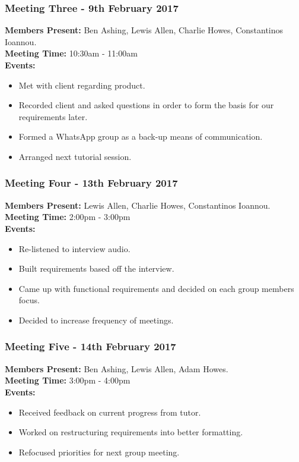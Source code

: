 \documentclass[a4paper]{article}
\begin{document}
\subsubsection*{Meeting Three - 9th February 2017}
\textbf{Members Present:} Ben Ashing, Lewis Allen, Charlie Howes, Constantinos Ioannou. \\
\textbf{Meeting Time:} 10:30am - 11:00am \\
\textbf{Events:} 
\begin{itemize}
    \item Met with client regarding product.
    \item Recorded client and asked questions in order to form the basis for our requirements later.
    \item Formed a WhatsApp group as a back-up means of communication.
    \item Arranged next tutorial session.
\end{itemize}

\subsubsection*{Meeting Four - 13th February 2017}
\textbf{Members Present:} Lewis Allen, Charlie Howes, Constantinos Ioannou. \\
\textbf{Meeting Time:} 2:00pm - 3:00pm \\
\textbf{Events:} 
\begin{itemize}
    \item Re-listened to interview audio.
    \item Built requirements based off the interview.
    \item Came up with functional requirements and decided on each group members focus.
    \item Decided to increase frequency of meetings.
\end{itemize}

\subsubsection*{Meeting Five - 14th February 2017}
\textbf{Members Present:} Ben Ashing, Lewis Allen, Adam Howes. \\
\textbf{Meeting Time:} 3:00pm - 4:00pm \\
\textbf{Events:} 
\begin{itemize}
    \item Received feedback on current progress from tutor.
    \item Worked on restructuring requirements into better formatting.
    \item Refocused priorities for next group meeting.
\end{itemize}
\end{document}
